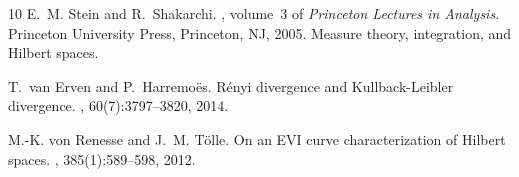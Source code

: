 \documentclass[reqno]{amsart}
\theoremstyle{plain}
\theoremstyle{remark}
\theoremstyle{plain}
\numberwithin{equation}{section}
\theoremstyle{remark}
\begin{document}
\begin{thebibliography}{10}
E.~M. Stein and R.~Shakarchi.
, volume~3 of {\em Princeton Lectures in
  Analysis}.
\newblock Princeton University Press, Princeton, NJ, 2005.
\newblock Measure theory, integration, and Hilbert spaces.

T.~van Erven and P.~Harremo\"es.
\newblock R\'enyi divergence and {K}ullback-{L}eibler divergence.
, 60(7):3797--3820, 2014.

M.-K. von Renesse and J.~M. T\"olle.
\newblock On an {EVI} curve characterization of {H}ilbert spaces.
, 385(1):589--598, 2012.







\end{thebibliography}
\end{document}
